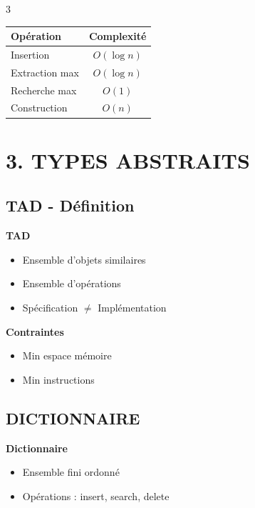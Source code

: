 \documentclass[10pt,a4paper,landscape]{article}
\begin{document}
\begin{multicols}{3}
\begin{complexbox}
\begin{tabular}{lc}
\textbf{Opération} & \textbf{Complexité} \\
\hline
Insertion & $O(\log n)$ \\
Extraction max & $O(\log n)$ \\
Recherche max & $O(1)$ \\
Construction & $O(n)$ \\
\end{tabular}
\end{complexbox}

\columnbreak

\section*{\color{titrebleu}3. TYPES ABSTRAITS}

\subsection*{TAD - Définition}

\begin{defbox}
\textbf{TAD}
\begin{itemize}
\item Ensemble d'objets similaires
\item Ensemble d'opérations
\item Spécification $\neq$ Implémentation
\end{itemize}
\end{defbox}

\begin{importbox}
\textbf{Contraintes}
\begin{itemize}
\item Min espace mémoire
\item Min instructions
\end{itemize}
\end{importbox}

\subsection*{DICTIONNAIRE}

\begin{defbox}
\textbf{Dictionnaire}
\begin{itemize}
\item Ensemble fini ordonné
\item Opérations : insert, search, delete
\end{itemize}
\end{defbox}


\end{multicols}
\end{document}
